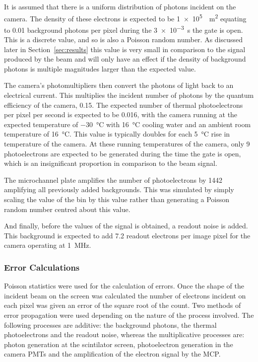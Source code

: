 It is assumed that there is a uniform distribution of photons incident on the
camera. The density of these electrons is expected to be
\SI{1e5}{\per\meter\squared} equating to \num{0.01} background photons per
pixel during the \SI{3e-3}{\second} the gate is open. This is a discrete
value, and so is also a Poisson random number. As discussed later in
Section~\ref{sec:results} this value is very small in comparison to the signal
produced by the beam and will only have an effect if the density of background
photons is multiple magnitudes larger than the expected value.

The camera's photomultipliers then convert the photons of light back to an
electrical current. This multiplies the incident number of photons by the
quantum efficiency of the camera, \num{0.15}. %
The expected number of 
thermal photoelectrons per pixel per second is expected to be \num{0.016}, with
the camera running at the expected temperature of \SI{-30}{\celsius} with
\SI{16}{\celsius} cooling water and an ambient room temperature of
\SI{16}{\celsius}. This value is typically doubles for each \SI{5}{\celsius}
rise in temperature of the camera. 
At these running temperatures of the camera, only 9 photoelectrons are expected
to be generated during the time the gate is open, which is an insignificant
proportion in comparison to the beam signal.

The microchannel plate amplifies the number of photoelectrons by \num{1442}
amplifying all previously added backgrounds.
This was simulated by simply scaling the value of the bin by this value rather
than generating a Poisson random number centred about this value.

And finally, before the values of the signal is obtained, a readout noise is
added. This background is expected to add \num{7.2} readout electrons per image
pixel for the camera operating at \SI{1}{\mega\hertz}.

\subsubsection{Error Calculations}

Poisson statistics were used for the calculation of errors.  Once the shape of
the incident beam on the screen was calculated the number of electrons incident
on each pixel was given an error of the square root of the count. Two methods
of error propagation were used depending on the nature of the process involved.
The following processes are additive: the background photons, the thermal
photoelectrons and the readout noise, whereas the multiplicative processes are:
photon generation at the scintilator screen, photoelectron generation in the
camera PMTs and the amplification of the electron signal by the MCP.

